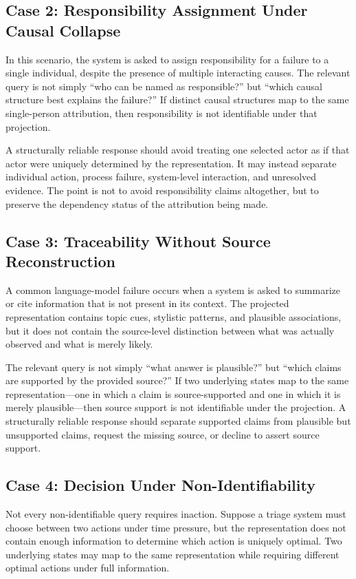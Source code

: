 \documentclass[11pt]{article}
\begin{document}
\subsection{Case 2: Responsibility Assignment Under Causal Collapse}

In this scenario, the system is asked to assign responsibility for a failure to a single individual, despite the presence of multiple interacting causes. The relevant query is not simply ``who can be named as responsible?'' but ``which causal structure best explains the failure?'' If distinct causal structures map to the same single-person attribution, then responsibility is not identifiable under that projection.

A structurally reliable response should avoid treating one selected actor as if that actor were uniquely determined by the representation. It may instead separate individual action, process failure, system-level interaction, and unresolved evidence. The point is not to avoid responsibility claims altogether, but to preserve the dependency status of the attribution being made.

\subsection{Case 3: Traceability Without Source Reconstruction}

A common language-model failure occurs when a system is asked to summarize or cite information that is not present in its context. The projected representation contains topic cues, stylistic patterns, and plausible associations, but it does not contain the source-level distinction between what was actually observed and what is merely likely.

The relevant query is not simply ``what answer is plausible?'' but ``which claims are supported by the provided source?'' If two underlying states map to the same representation---one in which a claim is source-supported and one in which it is merely plausible---then source support is not identifiable under the projection. A structurally reliable response should separate supported claims from plausible but unsupported claims, request the missing source, or decline to assert source support.

\subsection{Case 4: Decision Under Non-Identifiability}

Not every non-identifiable query requires inaction. Suppose a triage system must choose between two actions under time pressure, but the representation does not contain enough information to determine which action is uniquely optimal. Two underlying states may map to the same representation while requiring different optimal actions under full information.
\end{document}

